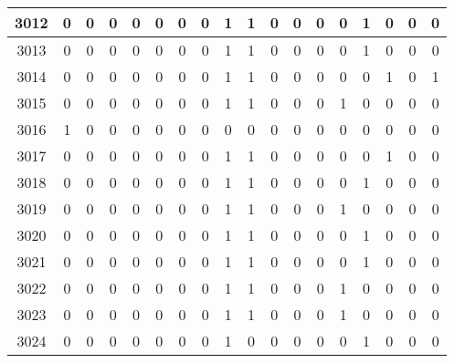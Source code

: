 \begin{tabular}{|c|c|c|c|c|c|c|c|c|c|c|c|c|c|c|c|c|c|}
\midrule
3012   &    0 &    0 &    0 &   0 &        0 &        0 &    0 &    1 &    1 &    0 &    0 &    0 &    0 &    1 &     0 &    0 &     0 \\
\midrule
3013   &    0 &    0 &    0 &   0 &        0 &        0 &    0 &    1 &    1 &    0 &    0 &    0 &    0 &    1 &     0 &    0 &     0 \\
\midrule
3014   &    0 &    0 &    0 &   0 &        0 &        0 &    0 &    1 &    1 &    0 &    0 &    0 &    0 &    0 &     1 &    0 &     1 \\
\midrule
3015   &    0 &    0 &    0 &   0 &        0 &        0 &    0 &    1 &    1 &    0 &    0 &    0 &    1 &    0 &     0 &    0 &     0 \\
\midrule
3016   &    1 &    0 &    0 &   0 &        0 &        0 &    0 &    0 &    0 &    0 &    0 &    0 &    0 &    0 &     0 &    0 &     0 \\
\midrule
3017   &    0 &    0 &    0 &   0 &        0 &        0 &    0 &    1 &    1 &    0 &    0 &    0 &    0 &    0 &     1 &    0 &     0 \\
\midrule
3018   &    0 &    0 &    0 &   0 &        0 &        0 &    0 &    1 &    1 &    0 &    0 &    0 &    0 &    1 &     0 &    0 &     0 \\
\midrule
3019   &    0 &    0 &    0 &   0 &        0 &        0 &    0 &    1 &    1 &    0 &    0 &    0 &    1 &    0 &     0 &    0 &     0 \\
\midrule
3020   &    0 &    0 &    0 &   0 &        0 &        0 &    0 &    1 &    1 &    0 &    0 &    0 &    0 &    1 &     0 &    0 &     0 \\
\midrule
3021   &    0 &    0 &    0 &   0 &        0 &        0 &    0 &    1 &    1 &    0 &    0 &    0 &    0 &    1 &     0 &    0 &     0 \\
\midrule
3022   &    0 &    0 &    0 &   0 &        0 &        0 &    0 &    1 &    1 &    0 &    0 &    0 &    1 &    0 &     0 &    0 &     0 \\
\midrule
3023   &    0 &    0 &    0 &   0 &        0 &        0 &    0 &    1 &    1 &    0 &    0 &    0 &    1 &    0 &     0 &    0 &     0 \\
\midrule
3024   &    0 &    0 &    0 &   0 &        0 &        0 &    0 &    1 &    0 &    0 &    0 &    0 &    0 &    1 &     0 &    0 &     0 \\\bottomrule\end{tabular}
